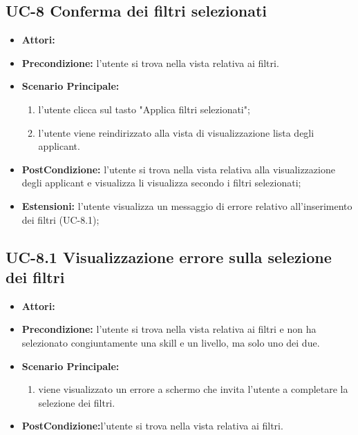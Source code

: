 \subsection{UC-8 Conferma dei filtri selezionati}
\begin{itemize}
\item \textbf{Attori:}\loggedusr
\item \textbf{Precondizione:} l'utente si trova nella vista relativa ai filtri.
\item \textbf{Scenario Principale:}
\begin{enumerate}
	\item l'utente clicca sul tasto "Applica filtri selezionati";
	\item l'utente viene reindirizzato alla vista di visualizzazione lista degli applicant.
\end{enumerate}
\item \textbf{PostCondizione:} l'utente si trova nella vista relativa alla visualizzazione degli applicant e visualizza li visualizza secondo i filtri selezionati;
\item \textbf{Estensioni:} l'utente visualizza un messaggio di errore relativo all'inserimento dei filtri (UC-8.1);
\end{itemize}

\subsection{UC-8.1 Visualizzazione errore sulla selezione dei filtri}
\begin{itemize}
\item \textbf{Attori:}\loggedusr
\item \textbf{Precondizione:} l'utente si trova nella vista relativa ai filtri e non ha selezionato congiuntamente una skill e un livello, ma solo uno dei due.
\item \textbf{Scenario Principale:}
\begin{enumerate}
	\item viene visualizzato un errore a schermo che invita l'utente a completare la selezione dei filtri.
\end{enumerate}
\item \textbf{PostCondizione:}l'utente si trova nella vista relativa ai filtri.
\end{itemize}


